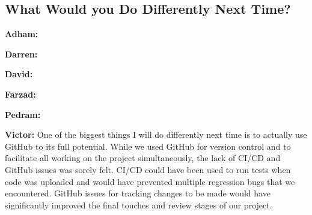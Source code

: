 \documentclass{article}
\begin{document}
\subsection{What Would you Do Differently Next Time?}

\textbf{Adham:}

\textbf{Darren:}

\textbf{David:}

\textbf{Farzad:}

\textbf{Pedram:}

\textbf{Victor:} One of the biggest things I will do differently next time is to actually use GitHub to its full potential. While we used GitHub for version control and to facilitate all working on the project simultaneously, the lack of CI/CD and GitHub issues was sorely felt. CI/CD could have been used to run tests when code was uploaded and would have prevented multiple regression bugs that we encountered. GitHub issues for tracking changes to be made would have significantly improved the final touches and review stages of our project.
\end{document}
